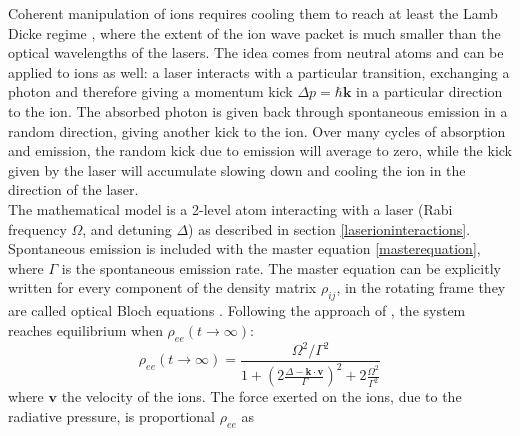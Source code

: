Coherent manipulation of ions requires cooling them to reach at least the Lamb Dicke regime \cite{Wineland1998}, where the extent of the ion wave packet is much smaller than the optical wavelengths of the lasers. The idea comes from neutral atoms \cite{1975OptCo..13...68H} and can be applied to ions as well: a laser interacts with a particular transition, exchanging a photon and therefore giving a momentum kick $\Delta p = \hbar \mathbf{k}$ in a particular direction to the ion. The absorbed photon is given back through spontaneous emission in a random direction, giving another kick to the ion. Over many cycles of absorption and emission, the random kick due to emission will average to zero, while the kick given by the laser will accumulate slowing down and cooling the ion in the direction of the laser. \\
The mathematical model is a 2-level atom interacting with a laser (Rabi frequency $\Omega$, and detuning $\Delta$) as described in section \ref{laserioninteractions}. Spontaneous emission is included with the master equation \eqref{masterequation}, where $\Gamma$ is the spontaneous emission rate. The master equation can be explicitly written for every component of the density matrix $\rho_{ij}$, in the rotating frame they are called optical Bloch equations \cite{foot}. Following the approach of \cite{gabriel}, the system reaches equilibrium when $\rho_{ee}(t\to \infty)$:
\begin{equation}
\rho_{ee}(t\to \infty) = \frac{\Omega^2/\Gamma^2}{1 + \left(2\frac{\Delta -\mathbf{k}\cdot \mathbf{v}}{\Gamma}\right)^2 + 2\frac{\Omega^2}{\Gamma^2}}
\end{equation}
where $\mathbf{v}$ the velocity of the ions. The force exerted on the ions, due to the radiative pressure, is proportional $\rho_{ee}$ as
